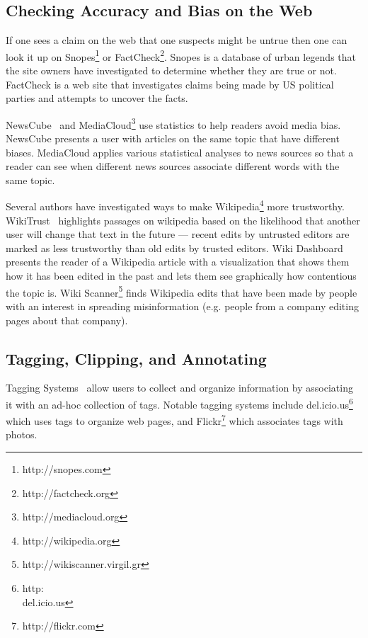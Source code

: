 \documentclass{chi2009}
\begin{document}
\subsection{Checking Accuracy and Bias on the Web}

If one sees a claim on the web that one suspects might be untrue then one can look it up on Snopes\footnote{http://snopes.com} or FactCheck\footnote{http://factcheck.org}. Snopes is a database of urban legends that the site owners have investigated to determine whether they are true or not. FactCheck is a web site that investigates claims being made by US political parties and attempts to uncover the facts. 

NewsCube~\cite{Park2009} and MediaCloud\footnote{http://mediacloud.org} use statistics to help readers avoid media bias. NewsCube presents a user with articles on the same topic that have different biases. MediaCloud applies various statistical analyses to news sources so that a reader can see when different news sources associate different words with the same topic.

Several authors have investigated ways to make Wikipedia\footnote{http://wikipedia.org} more trustworthy. WikiTrust~\cite{Adler2008} highlights passages on wikipedia based on the likelihood that another user will change that text in the future --- recent edits by untrusted editors are marked as less trustworthy than old edits by trusted editors. Wiki Dashboard~\cite{Kittur2008} presents the reader of a Wikipedia article with a visualization that shows them how it has been edited in the past and lets them see graphically how contentious the topic is. Wiki Scanner\footnote{http://wikiscanner.virgil.gr} finds Wikipedia edits that have been made by people with an interest in spreading misinformation (e.g. people from a company editing pages about that company).

% 
% 

\subsection{Tagging, Clipping, and Annotating}

Tagging Systems~\cite{Marlow2006,Golder2006} allow users to collect and organize information by associating it with an ad-hoc collection of tags. Notable tagging systems include del.icio.us\footnote{http:\\del.icio.us} which uses tags to organize web pages, and Flickr\footnote{http://flickr.com} which associates tags with photos. 
\end{document}
